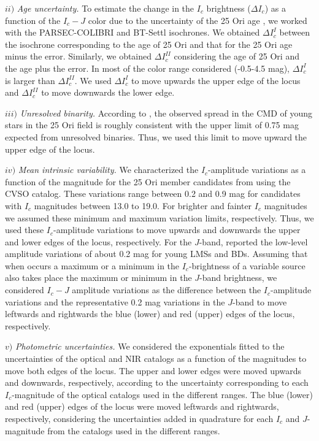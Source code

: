 \documentclass[12pt]{article}
\begin{document}
$ii)$ \emph{Age uncertainty.} To estimate the change in the $I_c$ brightness ($\Delta I_c$) as a function of the $I_c-J$ color due to the uncertainty of the 25 Ori age \citep[6.1$\pm$2.4; ][]{Briceno2018}, we worked with the PARSEC-COLIBRI and BT-Settl isochrones. We obtained $\Delta I_c^I$ between the isochrone corresponding to the age of 25 Ori and that for the 25 Ori age minus the error. Similarly, we obtained $\Delta I_c^{II}$ considering the age of 25 Ori and the age plus the error. In most of the color range considered (-0.5-4.5 mag), $\Delta I_c^I$ is larger than $\Delta I_c^{II}$. We used $\Delta I_c^I$ to move upwards the upper edge of the locus and $\Delta I_c^{II}$ to move downwards the lower edge.

$iii)$ \emph{Unresolved binarity.} According to \citet{Briceno2007}, the observed spread in the CMD of young stars in the 25 Ori field is roughly consistent with the upper limit of 0.75 mag expected from unresolved binaries. Thus, we used this limit to move upward the upper edge of the locus.

$iv)$ \emph{Mean intrinsic variability.} We characterized the $I_c$-amplitude variations as a function of the magnitude for the 25 Ori member candidates from \citet{Downes2014} using the CVSO catalog. These variations range between 0.2 and 0.9 mag for candidates with $I_c$ magnitudes between 13.0 to 19.0. For brighter and fainter $I_c$ magnitudes we assumed these minimum and maximum variation limits, respectively. Thus, we used these $I_c$-amplitude variations to move upwards and downwards the upper and lower edges of the locus, respectively. For the $J$-band, \citet{Scholz2009} reported the low-level amplitude variations of about 0.2 mag for young LMSs and BDs. Assuming that when occurs a maximum or a minimum in the $I_c$-brightness of a variable source also takes place the maximum or minimum in the $J$-band brightness, we considered $I_c-J$ amplitude variations as the difference between the $I_c$-amplitude variations and the representative 0.2 mag variations in the $J$-band to move leftwards and rightwards the blue (lower) and red (upper) edges of the locus, respectively.

$v)$ \emph{Photometric uncertainties.} We considered the exponentials fitted to the uncertainties of the optical and NIR catalogs as a function of the magnitudes to move both edges of the locus. The upper and lower edges were moved upwards and downwards, respectively, according to the uncertainty corresponding to each $I_c$-magnitude of the optical catalogs used in the different ranges. The blue (lower) and red (upper) edges of the locus were moved leftwards and rightwards, respectively, considering the uncertainties added in quadrature for each $I_c$ and $J$-magnitude from the catalogs used in the different ranges.
\end{document}
